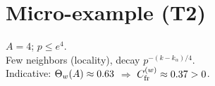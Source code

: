 \section{Micro-example (T2)}
$A=4$; $p\le e^4$. \\
Few neighbors (locality), decay $p^{-(k-k_\alpha)/4}$. \\
Indicative: $\Theta_w(A)\approx 0.63$ $\Rightarrow$ $C_{\mathrm{fr}}^{(w)}\approx 0.37>0$.
